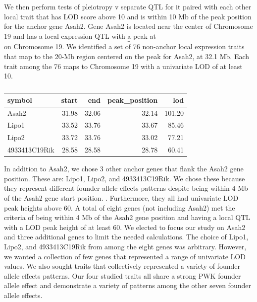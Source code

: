 \documentclass{article}
\begin{document}
We then perform tests of pleiotropy v separate QTL for it paired with each other local trait that has LOD score above 10 and is within 10 Mb of the peak position for the anchor gene Asah2.
Gene Asah2 is located near the center of Chromosome 19 and has a local expression QTL with a peak at $$\_$$  on Chromosome 19. We identified a set of 76 non-anchor local expression traits that map to the 20-Mb region centered on the peak for Asah2, at 32.1 Mb. Each trait among the 76 maps to Chromosome 19 with a univariate LOD of at least 10. 


\begin{table}[ht]
\centering
\begin{tabular}{lrrrr}
  \hline
symbol & start & end & peak\_position & lod \\ 
  \hline
Asah2 & 31.98 & 32.06 & 32.14 & 101.20 \\ 
  Lipo1 & 33.52 & 33.76 & 33.67 & 85.46 \\ 
  Lipo2 & 33.72 & 33.76 & 33.02 & 77.21 \\ 
  4933413C19Rik & 28.58 & 28.58 & 28.78 & 60.41 \\ 
   \hline
\end{tabular}
\caption{}\label{tab:ann4}
\end{table}




In addition to Asah2, we chose 3 other anchor genes that flank the Asah2 gene position. These are: Lipo1, Lipo2, and 4933413C19Rik. We chose these because they represent different founder allele effects patterns despite being within 4 Mb of the Asah2 gene start position.  . Furthermore, they all had univariate LOD peak heights above 60. A total of eight genes (not including Asah2) met the criteria of being within 4 Mb of the Asah2 gene position and having a local QTL with a LOD peak height of at least 60. We elected to focus our study on Asah2 and three additional genes to limit the needed calculations. The choice of Lipo1, Lipo2, and 4933413C19Rik from among the eight genes was arbitrary. However, we wanted a collection of few genes that represented a range of univariate LOD values. We also sought traits that collectively represented a variety of founder allele effects patterns. Our four studied traits all share a strong PWK founder allele effect and demonstrate a variety of patterns among the other seven founder allele effects. 
\end{document}
